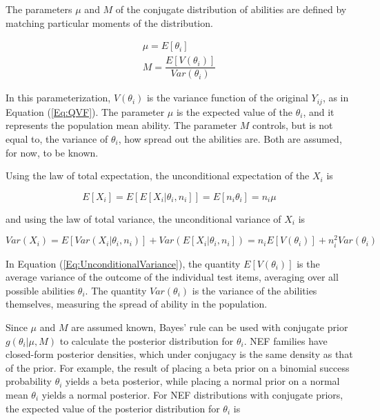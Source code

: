 \documentclass[12pt,epsfig]{article}
\begin{document}
The parameters $\mu$ and $M$ of the conjugate distribution of abilities are defined by matching particular moments of the distribution.

\begin{equation}
    \begin{aligned}
        \mu = E[\theta_i]\\ 
         M = \dfrac{E[V(\theta_i)]}{Var(\theta_i)}
    \end{aligned}
    \label{Eq:Parameterization}
\end{equation}


\noindent In this parameterization, $V(\theta_i)$ is the variance function of the original $Y_{ij}$, as in Equation (\ref{Eq:QVF}). The parameter $\mu$ is the expected value of  the $\theta_i$, and it represents the population mean ability. The parameter $M$ controls, but is not equal to, the variance of $\theta_i$, how spread out the abilities are. Both are assumed, for now, to be known.

Using the law of total expectation, the unconditional expectation of the $X_i$ is

\begin{equation*}
E[X_i] = E[E[X_i | \theta_i, n_i]] = E[n_i \theta_i] = n_i \mu
\end{equation*}

\noindent and using the law of total variance, the unconditional variance of $X_i$ is

\begin{equation}
Var(X_i) = E[Var(X_i | \theta_i, n_i)] + Var(E[X_i | \theta_i, n_i]) = n_i E[ V(\theta_i)] + n_i^2 Var(\theta_i)
\label{Eq:UnconditionalVariance}
\end{equation}


\noindent In Equation (\ref{Eq:UnconditionalVariance}), the quantity $E[V(\theta_i)]$ is the average variance of the outcome of the individual test items, averaging over all possible abilities $\theta_i$. The quantity $Var(\theta_i)$ is the variance of the abilities themselves, measuring the spread of ability in the population.



Since $\mu$ and $M$ are assumed known, Bayes' rule can be used with conjugate prior $g(\theta_i | \mu, M)$ to calculate the posterior distribution for $\theta_i$. NEF families have closed-form posterior densities, which under conjugacy is the same density as that of the prior. For example, the result of placing a beta prior on a binomial success probability $\theta_i$ yields a beta posterior, while placing a normal prior on a normal mean $\theta_i$ yields a normal posterior. For NEF distributions with conjugate priors, the expected value of the posterior distribution for $\theta_i$ is 
\end{document}
